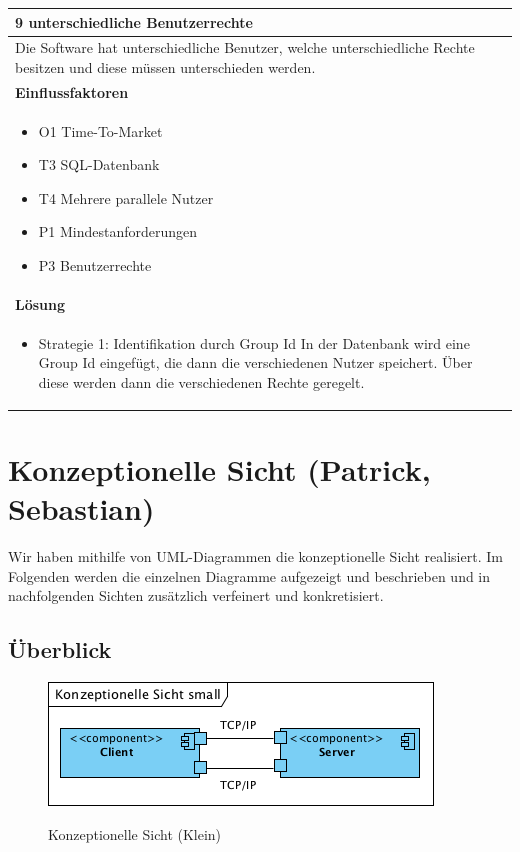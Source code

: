 \documentclass[fontsize=12pt,paper=a4,twoside]{scrartcl}
\begin{document}
\begin{table}[H]
\begin{tabular}{|p{\textwidth}|}\hline
9 unterschiedliche Benutzerrechte\\ \hline
Die Software hat unterschiedliche Benutzer, welche unterschiedliche Rechte besitzen und diese müssen unterschieden werden.\\ \hline
\textbf{Einflussfaktoren}\\
\begin{itemize}
\item O1 Time-To-Market
\item T3 SQL-Datenbank
\item T4 Mehrere parallele Nutzer
\item P1 Mindestanforderungen
\item P3 Benutzerrechte
\end{itemize}\\ \hline
\textbf{Lösung}\\
\begin{itemize}
\item Strategie 1: Identifikation durch Group Id \leavevmode\newline
In der Datenbank wird eine Group Id eingefügt, die dann die verschiedenen Nutzer speichert. Über diese werden dann die verschiedenen Rechte geregelt.
\end{itemize} \\ \hline
\end{tabular}
\end{table}

\newpage

\section{Konzeptionelle Sicht (Patrick, Sebastian)}
\label{sec:konzeptionell}

Wir haben mithilfe von UML-Diagrammen die konzeptionelle Sicht realisiert. Im Folgenden werden die einzelnen Diagramme aufgezeigt und beschrieben und in nachfolgenden Sichten zusätzlich verfeinert und konkretisiert.

\subsection{Überblick}
\label{Ueberblick}

\begin{figure} [H] 
\caption{Konzeptionelle Sicht (Klein)} \centering
	\includegraphics[scale=2]{Diagramme/KonzeptionelleSichtKlein.png} 
	\label{pic:konzeptionellesichtklein} 
\end{figure}
\end{document}
